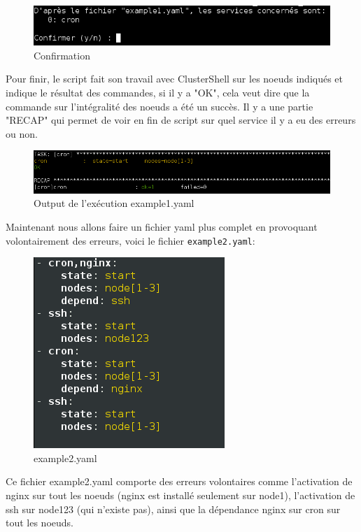 \documentclass[a4paper,11pt]{article}
\begin{document}
\begin{figure}[H]
		\centerline{\includegraphics[scale=0.7]{confirmation_yaml.png}}
		\caption{Confirmation}
\end{figure}
\pagebreak
\noindent
Pour finir, le script fait son travail avec ClusterShell sur les noeuds indiqués et indique le résultat des commandes, si il y a "OK", cela veut dire que la commande sur l'intégralité des noeuds a été un succès. Il y a une partie "RECAP" qui permet de voir en fin de script sur quel service il y a eu des erreurs ou non.
\smallbreak

\begin{figure}[H]
		\centerline{\includegraphics[scale=0.6]{resultat_yaml.png}}
		\caption{Output de l'exécution example1.yaml}
\end{figure}
\noindent
Maintenant nous allons faire un fichier yaml plus complet en provoquant volontairement des erreurs, voici le fichier \verb?example2.yaml?:

\begin{figure}[H]
		\centerline{\includegraphics[scale=0.6]{example2_yaml.png}}
		\caption{example2.yaml}
\end{figure}
\noindent
Ce fichier example2.yaml comporte des erreurs volontaires comme l'activation de nginx sur tout les noeuds (nginx est installé seulement sur node1), l'activation de ssh sur node123 (qui n'existe pas), ainsi que la dépendance nginx sur cron sur tout les noeuds.
\end{document}
